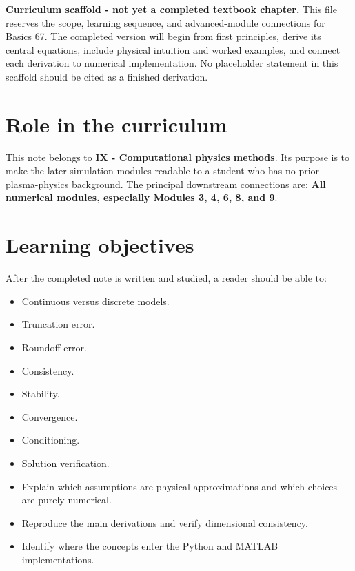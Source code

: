 \documentclass[11pt]{article}
\begin{document}

\begin{overviewbox}
\textbf{Curriculum scaffold - not yet a completed textbook chapter.} This file reserves the scope, learning sequence, and advanced-module connections for Basics 67. The completed version will begin from first principles, derive its central equations, include physical intuition and worked examples, and connect each derivation to numerical implementation. No placeholder statement in this scaffold should be cited as a finished derivation.
\end{overviewbox}

\ProjectTOC

\section{Role in the curriculum}
This note belongs to \textbf{IX - Computational physics methods}. Its purpose is to make the later simulation modules readable to a student who has no prior plasma-physics background. The principal downstream connections are: \textbf{All numerical modules, especially Modules 3, 4, 6, 8, and 9}.

\section{Learning objectives}
After the completed note is written and studied, a reader should be able to:
\begin{itemize}[leftmargin=1.6em]
\item Continuous versus discrete models.
\item Truncation error.
\item Roundoff error.
\item Consistency.
\item Stability.
\item Convergence.
\item Conditioning.
\item Solution verification.
\item Explain which assumptions are physical approximations and which choices are purely numerical.
\item Reproduce the main derivations and verify dimensional consistency.
\item Identify where the concepts enter the Python and MATLAB implementations.
\end{itemize}
\end{document}
